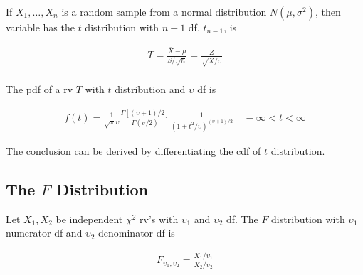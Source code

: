 \begin{theorem}
    If $X_1,\dots,X_n$ is a random sample from a normal distribution $N(\mu,\sigma^2)$, then variable has the $t$ distribution with $n-1$ df, $t_{n-1}$, is 

    \begin{align*}
        T=\frac{\bar{X}-\mu}{S/\sqrt{n}}=\frac{Z}{\sqrt{X/\upsilon}} \\
    \end{align*}

    The pdf of a rv $T$ with $t$ distribution and $\upsilon$ df is 

    \begin{align*}
        f(t) = \frac{1}{\sqrt{\pi}\upsilon}\frac{\Gamma[(\upsilon+1)/2]}{\Gamma(\upsilon/2)}\frac{1}{(1+t^2/\upsilon)^{(\upsilon+1)/2}}\quad -\infty<t<\infty
    \end{align*}

    The conclusion can be derived by differentiating the cdf of $t$ distribution.
\end{theorem}

\subsection{The $F$ Distribution}

\begin{definition}
    Let $X_1,X_2$ be independent $\chi^2$ rv's with $\upsilon_1$ and $\upsilon_2$ df. The $F$ distribution with $\upsilon_1$ numerator df and $\upsilon_2$ denominator df is 

    \begin{align*}
        F_{\upsilon_1,\upsilon_2}=\frac{X_1/\upsilon_1}{X_2/\upsilon_2} \\
    \end{align*}
\end{definition}
